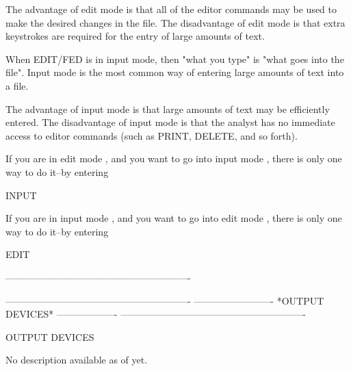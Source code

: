    The advantage of    edit mode   is that
   all of the editor commands may be used to
   make the desired changes in the file.
   The disadvantage of    edit mode is that
   extra keystrokes are required for the entry
   of large amounts of text.
 
   When EDIT/FED is in    input mode,
   then "what you type" is "what goes into
   the file".  Input mode   is the most
   common way of entering large amounts
   of text into a file.
 
   The advantage of    input mode   is that
   large amounts of text may be efficiently
   entered.   The disadvantage of    input mode
   is that the analyst has no immediate access
   to editor commands (such as PRINT, DELETE,
   and so forth).
 
   If you are in   edit mode   , and you want
   to go into   input mode   , there is only
   one way to do it--by entering
 
      INPUT
 
   If you are in   input mode   , and you want
   to go into   edit mode   , there is only
   one way to do it--by entering
 
      EDIT
 
----------------------------------------------------------
 
 
 
 
 
 
 
 
 
 
 
 
 
 
 
 
 
 
 
 
 
 
 
 
 
 
 
 
 
 
 
 
 
 
 
 
 
 
 
 
 
 
 
 
----------------------------------------------------------
-------------------------  *OUTPUT DEVICES*  -------------------
----------------------------------------------------------
 
OUTPUT DEVICES
 
 
No description available as of yet.
 
